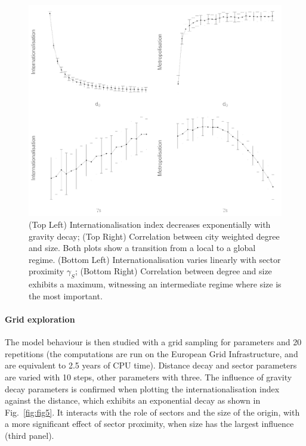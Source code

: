 \documentclass[10pt,letterpaper]{article}
\begin{document}
\begin{figure}
	\begin{center}
	    \includegraphics[width=\linewidth]{figures/Fig4.png}
	\end{center}
	\vspace{2cm}
    \caption{(Top Left) Internationalisation index decreases exponentially with gravity decay; (Top Right) Correlation between city weighted degree and size. Both plots show a transition from a local to a global regime. (Bottom Left) Internationalisation varies linearly with sector proximity $\gamma_S$; (Bottom Right) Correlation between degree and size exhibits a maximum, witnessing an intermediate regime where size is the most important. \label{fig:fig4}}
\end{figure}



\paragraph{Grid exploration}

The model behaviour is then studied with a grid sampling for parameters and 20 repetitions (the computations are run on the European Grid Infrastructure, and are equivalent to 2.5 years of CPU time). Distance decay and sector  parameters are varied with 10 steps, other parameters with three. The influence of gravity decay parameters is confirmed when plotting the internationalisation index against the distance, which exhibits an exponential decay as shown in Fig.~\ref{fig:fig5}. It interacts with the role of sectors and the size of the origin, with a more significant effect of sector proximity, when size has the largest influence (third panel).
\end{document}
